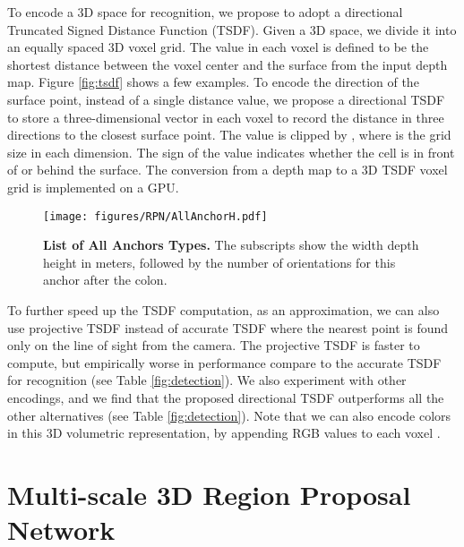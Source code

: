 \documentclass[10pt,twocolumn,letterpaper]{article}
\begin{document}
To encode a 3D space for recognition, we propose to adopt a directional Truncated Signed Distance Function (TSDF). Given a 3D space, we divide it into an equally spaced 3D voxel grid.
The value in each voxel is defined to be the shortest distance between the voxel center and the surface from the input depth map. 
Figure \ref{fig:tsdf} shows a few examples.
To encode the direction of the surface point, 
instead of a single distance value, 
we propose a directional TSDF to store a three-dimensional vector  in each voxel to record the distance in three directions to the closest surface point. 
The value is clipped by , where  is the grid size in each dimension. 
The sign of the value indicates whether the cell is in front of or behind the surface. 
The conversion from a depth map to a 3D TSDF voxel grid is implemented on a GPU.


\begin{figure}[t]
\vspace{-5mm}
\texttt{[image: figures/RPN/AllAnchorH.pdf]}

\caption{{\bf List of All Anchors Types. }
The subscripts show the width  depth  height in meters, followed by the number of orientations for this anchor after the colon. }
\label{fig:AllAnchor}
\vspace{-3mm}
\end{figure}

To further speed up the TSDF computation, 
as an approximation, 
we can also use projective TSDF instead of accurate TSDF where the nearest point is found only on the line of sight from the camera.
The projective TSDF is faster to compute,
but empirically worse in performance compare to the accurate TSDF for recognition (see Table \ref{fig:detection}).
We also experiment with other encodings, 
and we find that the proposed directional TSDF outperforms all the other alternatives (see Table \ref{fig:detection}).
Note that we can also encode colors in this 3D volumetric representation,
by appending RGB values to each voxel \cite{whelan2013robust}.


\section{Multi-scale 3D Region Proposal Network}
\label{sec:RegionProposalNetwork}
\end{document}
